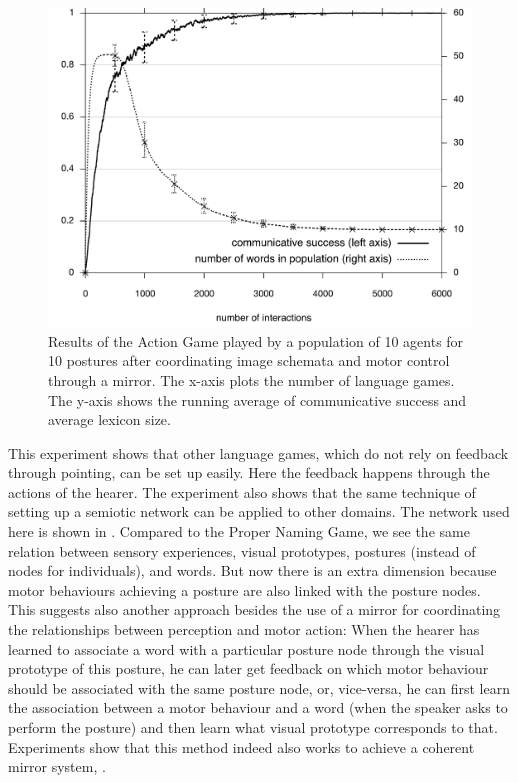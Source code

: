 \begin{figure}
\centerline{\includegraphics[width=0.6\linewidth]{chap11/figs/commsuccess.pdf}}
\caption{\label{commsuccess}Results of the Action Game played by a population of 10 agents 
for 10 postures after coordinating image schemata and motor control through a mirror. 
The x-axis plots the number of language games. The y-axis shows the running average of 
communicative success and average lexicon size.}
\end{figure}

This experiment shows that other language games, which do not rely on feedback through pointing, can be set up easily. 
Here the feedback happens through the actions of the hearer. The experiment also shows
that the same technique of setting up a semiotic network can be applied to other domains. 
The network used here is shown in . Compared to the Proper Naming Game, we see the same relation between 
sensory experiences, visual prototypes, postures (instead of nodes for individuals), 
and words. But now there is an extra dimension because motor behaviours 
achieving a posture are also linked with the posture nodes. This suggests also another approach besides the use of a mirror 
for coordinating the relationships between perception and motor action: When the hearer has learned to associate a word with a particular
posture node through the visual prototype of this posture, he can later get feedback on which motor behaviour should be 
associated with the same posture node, or, vice-versa, he can first learn the association between a motor behaviour and 
a word (when the speaker asks to perform the posture) and then learn what visual prototype corresponds to that. 
Experiments show that this method indeed also works to achieve a coherent mirror system, \cite{Steels:2008}.



